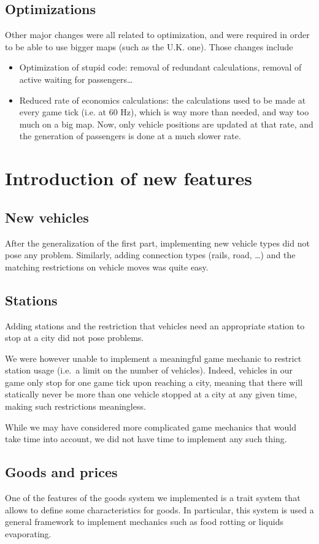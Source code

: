 \documentclass{article}
\begin{document}
\subsection{Optimizations}
Other major changes were all related to optimization, and were required in order to be able to use
bigger maps (such as the U.K. one). Those changes include
\begin{itemize}
\item Optimization of stupid code: removal of redundant calculations, removal of active waiting for passengers\dots
\item Reduced rate of economics calculations: the calculations used to be made at every game tick (i.e. at 60 Hz),
which is way more than needed, and way too much on a big map.
Now, only vehicle positions are updated at that rate, and the generation of passengers is done at a much slower rate.
\end{itemize}


\section{Introduction of new features}
\subsection{New vehicles}
After the generalization of the first part, implementing new vehicle types did not pose any problem.
Similarly, adding connection types (rails, road, \dots) and the matching restrictions on vehicle moves was quite easy.

\subsection{Stations}
Adding stations and the restriction that vehicles need an appropriate station to stop at a city did not pose problems. 

We were however unable to implement a meaningful game mechanic to restrict station usage (i.e.\ a limit on the number of vehicles).
Indeed, vehicles in our game only stop for one game tick upon reaching a city, meaning that there
will statically never be more than one vehicle stopped at a city at any given time, making such restrictions meaningless.

While we may have considered more complicated game mechanics that would take time into account,
we did not have time to implement any such thing.

\subsection{Goods and prices}
One of the features of the goods system we implemented is a trait system that allows to define some characteristics
for goods. In particular, this system is used a general framework to implement mechanics such as food rotting or liquids evaporating.
\end{document}
